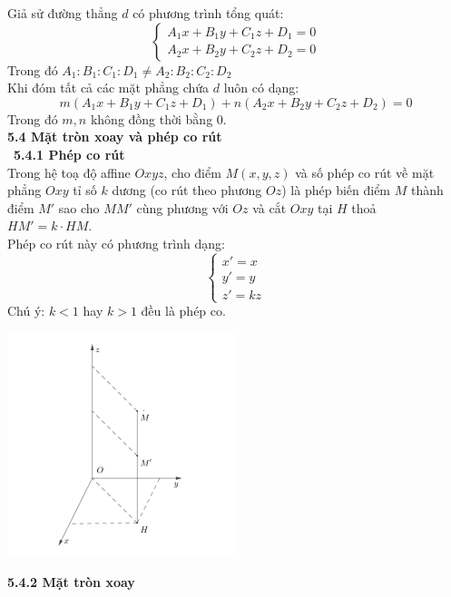 \documentclass[12pt,a4]{article}
\begin{document}
\begin{titlepage}
\begin{center}
\begin{tikzpicture}[scale=2]
        \end{tikzpicture}
\end{center}
Giả sử đường thẳng $d$ có phương trình tổng quát:
\[
\begin{cases} A_1x + B_1y + C_1z + D_1 = 0\\A_2x + B_2y + C_2z + D_2 = 0\end{cases}
\]
Trong đó $A_1 : B_1 : C_1 :  D_1 \neq A_2 : B_2 : C_2 : D_2$\\
Khi đóm tất cả các mặt phẳng chứa $d$ luôn có dạng:\\
\[
m(A_1x + B_1y + C_1z + D_1) + n(A_2x + B_2y + C_2z + D_2) = 0
\]
Trong đó $m, n$ không đồng thời bằng 0.\\
\vspace{0.2cm}
\textbf{5.4 Mặt tròn xoay và phép co rút}\\
\vspace{0.2cm}\
\textbf{5.4.1 Phép co rút}\\
Trong hệ toạ độ affine $Oxyz$, cho điểm $M(x,y,z)$ và số phép co rút về mặt phẳng $Oxy$ tỉ số $k$ dương (co rút theo phương $Oz$) là phép biến điểm $M$ thành điểm $M'$ sao cho $MM'$ cùng phương với $Oz$ và cắt $Oxy$ tại $H$ thoả $HM' = k\cdot HM.$\\
Phép co rút này có phương trình dạng:
\[
\begin{cases} x' = x\\y' = y \\z' = kz\end{cases}
\]
Chú ý: $k < 1$ hay $k > 1$ đều là phép co.\\
\begin{center}
    \includegraphics[width=0.5\textwidth]{image/corut.png}
\end{center}
\vspace{0.2cm}
\textbf{5.4.2 Mặt tròn xoay}\\
\vspace{0.2cm}

\end{titlepage}
\end{document}
